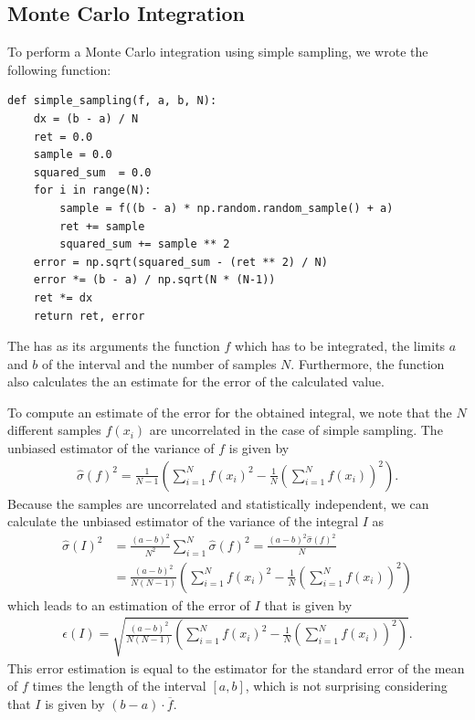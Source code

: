 \documentclass[a4paper,10pt,bibtotoc]{scrartcl}
\begin{document}
\subsection{Monte Carlo Integration}
To perform a Monte Carlo integration using simple sampling, we wrote the following function:
\begin{lstlisting}
def simple_sampling(f, a, b, N):
    dx = (b - a) / N
    ret = 0.0
    sample = 0.0
    squared_sum  = 0.0
    for i in range(N):
        sample = f((b - a) * np.random.random_sample() + a)
        ret += sample
        squared_sum += sample ** 2
    error = np.sqrt(squared_sum - (ret ** 2) / N)
    error *= (b - a) / np.sqrt(N * (N-1))
    ret *= dx
    return ret, error
\end{lstlisting}
The has as its arguments the function $f$ which has to be integrated, the limits $a$ and $b$ of the interval and the number of samples $N$. 
Furthermore, the function also calculates the an estimate for the error of the calculated value.

To compute an estimate of the error for the obtained integral, we note that the $N$ different samples $f(x_i)$ are uncorrelated in the case of simple sampling.
The unbiased estimator of the variance of $f$ is given by
\begin{align}
\hat{\sigma}(f)^2 = \frac{1}{N-1}\left(\sum_{i=1}^{N}f(x_i)^2-\frac{1}{N}\left(\sum_{i=1}^{N}f(x_i)\right)^2\right).
\end{align}
Because the samples are uncorrelated and statistically independent, we can calculate the unbiased estimator of the variance of the integral $I$ as
\begin{align}
\hat{\sigma}(I)^2 &= \frac{\left(a-b\right)^2}{N^2}\sum_{i=1}^{N} \hat{\sigma}(f)^2 = \frac{\left(a-b\right)^2\hat{\sigma}(f)^2}{N}\\
&=\frac{\left(a-b\right)^2}{N\left(N-1\right)}\left(\sum_{i=1}^{N}f(x_i)^2-\frac{1}{N}\left(\sum_{i=1}^{N}f(x_i)\right)^2\right)
\end{align}
which leads to an estimation of the error of $I$ that is given by
\begin{align}
\epsilon(I)=\sqrt{\frac{\left(a-b\right)^2}{N\left(N-1\right)}\left(\sum_{i=1}^{N}f(x_i)^2-\frac{1}{N}\left(\sum_{i=1}^{N}f(x_i)\right)^2\right)}.
\end{align}
This error estimation is equal to the estimator for the standard error of the mean of $f$ times the length of the interval $[a,b]$, which is not surprising considering that $I$ is given by $\left(b-a\right)\cdot \overline{f}$.
\end{document}
